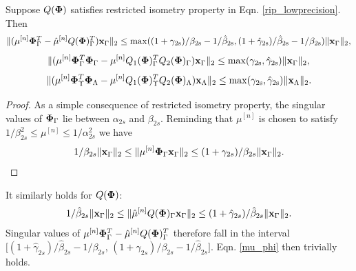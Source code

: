 \documentclass{article}
\begin{document}
\begin{corollary}\label{corollary_auxiliary_results}
Suppose $Q(\boldsymbol{{\bf \Phi}})$ satisfies restricted isometry property in Eqn. \ref{rip_lowprecision}. Then
\begin{equation}\label{mu_phi}
    \| ({\mu}^{[n]}{\bf {\bf \Phi}}_{\Gamma}^T-\hat{\mu}^{[n]}Q({\bf {\bf \Phi}})_{\Gamma}^T){\bf x}_{\Gamma}\|_2 \leq \rm{max}(({1+\gamma_{2s}})/{\beta_{2s}}-{1}/{\hat{\beta}_{2s}}, ({1+\hat{\gamma}_{2s}})/{\hat{\beta}_{2s}}-{1}/{\beta_{2s}})\| {\bf x}_{\Gamma}\|_2,
\end{equation} 
\begin{equation}\label{mu_phi2}
    \|( \mu^{[n]}{\bf \Phi}_{\Gamma}^T\boldsymbol{\Phi}_{\Gamma} - \mu^{[n]}Q_1(\boldsymbol{\Phi})_{\Gamma}^TQ_2(\boldsymbol{\Phi})_{\Gamma}){\bf x}_{\Gamma}\|_2 \leq \rm{max}(\gamma_{2s}, \hat{\gamma}_{2s})\| {\bf x}_{\Gamma}\|_2,
\end{equation}
\begin{equation}\label{mu_phi2_diff}
    \| (\mu^{[n]}\boldsymbol{\Phi}_{\Upsilon}^T\boldsymbol{\Phi}_{\Lambda} - \mu^{[n]}Q_1(\boldsymbol{\Phi})_{\Upsilon}^TQ_2(\boldsymbol{\Phi})_{\Lambda}){\bf x}_{\Lambda}\|_2 \leq \rm{max}(\gamma_{2s}, \hat{\gamma}_{2s})\| {\bf x}_{\Lambda}\|_2.
\end{equation}
\end{corollary}
\begin{proof}
As a simple consequence of restricted isometry property, the singular values of ${\bf \Phi}_{\Gamma}$ lie between $\alpha_{2s}$ and $\beta_{2s}$. Reminding that $\mu^{[n]}$ is chosen to satisfy $1/\beta^2_{2s}\leq \mu^{[n]}\leq 1/\alpha^2_{2s}$ we have
\begin{equation}
\begin{aligned}
   1/\beta_{2s} \| {\bf x}_{\Gamma}\|_2\leq \|{\mu}^{[n]}{\bf {\bf \Phi}}_{\Gamma} {\bf x}_{\Gamma}\|_2\leq (1+\gamma_{2s})/\beta_{2s}\| {\bf x}_{\Gamma}\|_2.
\end{aligned}
\end{equation}
\end{proof}
It similarly holds for $Q(\boldsymbol{{\bf \Phi}})$:
\begin{equation}
\begin{aligned}
   1/\hat{\beta}_{2s} \| {\bf x}_{\Gamma}\|_2\leq \|{\hat{\mu}}^{[n]}Q({\bf {\bf \Phi}})_{\Gamma} {\bf x}_{\Gamma}\|_2\leq (1+\hat{\gamma}_{2s})/\hat{\beta}_{2s}\| {\bf x}_{\Gamma}\|_2.
\end{aligned}
\end{equation}
Singular values of ${\mu}^{[n]}{\bf {\bf \Phi}}_{\Gamma}^T-\hat{\mu}^{[n]}Q({\bf {\bf \Phi}})_{\Gamma}^T$ therefore fall in the interval $[({1+\hat{\gamma}_{2s}})/{\hat{\beta}_{2s}}-{1}/{\beta_{2s}}$, $({1+\gamma_{2s}})/{\beta_{2s}}-{1}/{\hat{\beta}_{2s}}]$. Eqn. \ref{mu_phi} then trivially holds.
\end{document}

